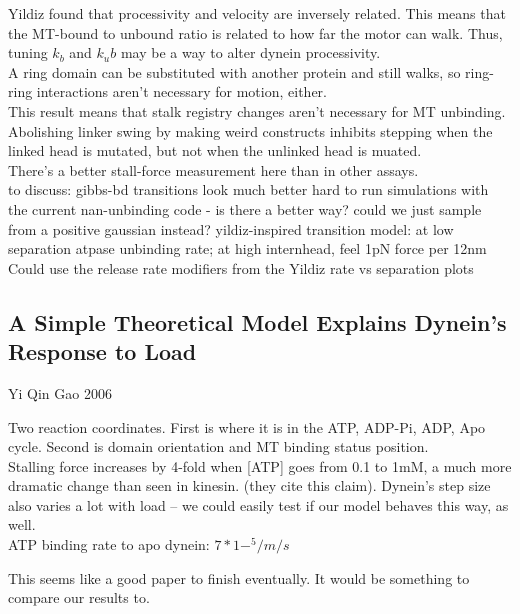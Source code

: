 \documentclass[10pt]{article} %
\begin{document}
Yildiz found that processivity and velocity are inversely related. This means that the MT-bound to unbound ratio is related to how far the motor can walk. Thus, tuning $k_b$ and $k_ub$ may be a way to alter dynein processivity.\\

A ring domain can be substituted with another protein and still walks, so ring-ring interactions aren't necessary for motion, either.\\

This result means that stalk registry changes aren't necessary for MT unbinding.\\

Abolishing linker swing by making weird constructs inhibits stepping when the linked head is mutated, but not when the unlinked head is muated.\\

There's a better stall-force measurement here than in other assays.\\

to discuss:
        gibbs-bd transitions look much better
        hard to run simulations with the current nan-unbinding code - is there a better way? could we just sample from a positive gaussian instead?
        yildiz-inspired transition model: at low separation atpase unbinding rate; at high internhead, feel 1pN force per 12nm
                        Could use the release rate modifiers from the Yildiz rate vs separation plots

\subsection{A Simple Theoretical Model Explains Dynein’s Response to Load}
Yi Qin Gao 2006

Two reaction coordinates. First is where it is in the ATP, ADP-Pi, ADP, Apo cycle. Second is domain orientation and MT binding status position.\\

Stalling force increases by 4-fold when [ATP] goes from 0.1 to 1mM, a much more dramatic change than seen in kinesin. (they cite this claim). Dynein's step size also varies a lot with load -- we could easily test if our model behaves this way, as well.\\

ATP binding rate to apo dynein: $7*1-^5/m/s$

This seems like a good paper to finish eventually. It would be something to compare our results to.\\
\end{document}
